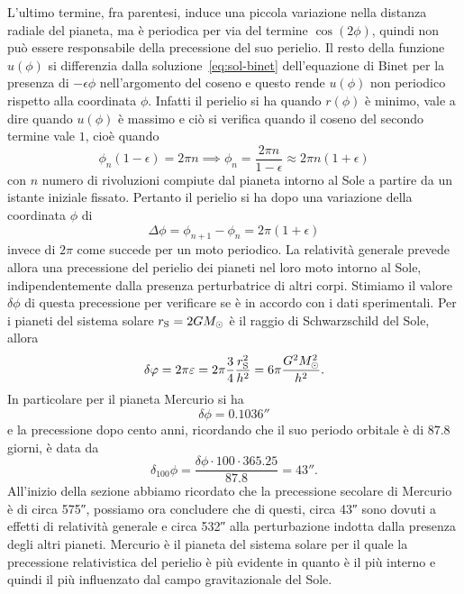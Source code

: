 L'ultimo termine, fra parentesi, induce una piccola variazione nella distanza
radiale del pianeta, ma è periodica per via del termine $\cos(2\phi)$, quindi
non può essere responsabile della precessione del suo perielio.  Il resto della
funzione $u(\phi)$ si differenzia dalla soluzione~\eqref{eq:sol-binet}
dell'equazione di Binet per la presenza di $-\epsilon\phi$ nell'argomento del
coseno e questo rende $u(\phi)$ non periodico rispetto alla coordinata $\phi$.
Infatti il perielio si ha quando $r(\phi)$ è minimo, vale a dire quando
$u(\phi)$ è massimo e ciò si verifica quando il coseno del secondo termine vale
$1$, cioè quando
\begin{equation}
  \phi_{n}(1 - \epsilon) = 2\pi n \implies \phi_{n} = \frac{2\pi n}{1 -
    \epsilon} \approx 2\pi n(1 + \epsilon)
\end{equation}
con $n$ numero di rivoluzioni compiute dal pianeta intorno al Sole a partire da
un istante iniziale fissato.  Pertanto il perielio si ha dopo una variazione
della coordinata $\phi$ di
\begin{equation}
  \Delta\phi = \phi_{n+1} - \phi_{n} = 2\pi(1 + \epsilon)
\end{equation}
invece di $2\pi$ come succede per un moto periodico.  La relatività generale
prevede allora una precessione del perielio dei pianeti nel loro moto intorno al
Sole, indipendentemente dalla presenza perturbatrice di altri corpi.  Stimiamo
il valore $\delta\phi$ di questa precessione per verificare se è in accordo con
i dati sperimentali.  Per i pianeti del sistema solare
$r_{\textup{S}} = 2GM_{\odot}$ è il raggio di Schwarzschild del Sole, allora
\begin{equation}
  \delta\phi = 2\pi\epsilon = 2\pi \frac{3}{4}\frac{r_{\textup{S}}^{2}}{h^{2}} =
  6\pi \frac{G^{2}M_{\odot}^{2}}{h^{2}}.
\end{equation}
In particolare per il pianeta Mercurio si ha
\begin{equation}
  \delta\phi = \ang{;;0.1036}
\end{equation}
e la precessione dopo cento anni, ricordando che il suo periodo orbitale è di
$87.8$ giorni, è data da
\begin{equation}
  \delta_{100}\phi = \frac{\delta\phi \cdot 100 \cdot 365.25}{87.8} =
  \ang{;;43}.
\end{equation}
All'inizio della sezione abbiamo ricordato che la precessione secolare di
Mercurio è di circa \ang{;;575}, possiamo ora concludere che di questi, circa
\ang{;;43} sono dovuti a effetti di relatività generale e circa \ang{;;532} alla
perturbazione indotta dalla presenza degli altri pianeti.  Mercurio è il pianeta
del sistema solare per il quale la precessione relativistica del perielio è più
evidente in quanto è il più interno e quindi il più influenzato dal campo
gravitazionale del Sole.

